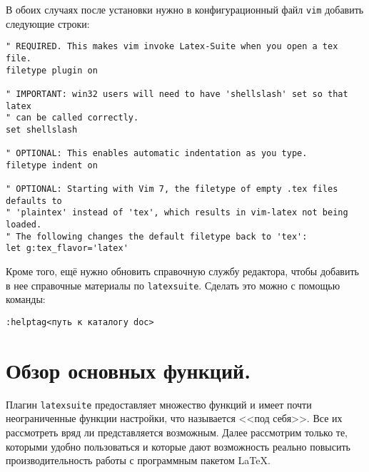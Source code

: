 \documentclass[a4paper]{article}
\begin{document}
В обоих случаях после установки нужно в 
конфигурационный файл \texttt{vim} добавить следующие строки:
\begin{verbatim}
" REQUIRED. This makes vim invoke Latex-Suite when you open a tex file.
filetype plugin on

" IMPORTANT: win32 users will need to have 'shellslash' set so that latex
" can be called correctly.
set shellslash

" OPTIONAL: This enables automatic indentation as you type.
filetype indent on

" OPTIONAL: Starting with Vim 7, the filetype of empty .tex files defaults to
" 'plaintex' instead of 'tex', which results in vim-latex not being loaded.
" The following changes the default filetype back to 'tex':
let g:tex_flavor='latex'
\end{verbatim}

Кроме того, ещё нужно обновить справочную службу редактора, чтобы добавить
в нее справочные материалы по \texttt{latexsuite}. Сделать это можно с помощью
команды: \begin{verbatim}
:helptag<путь к каталогу doc>
\end{verbatim}
\part{Обзор основных функций.}
Плагин \texttt{latexsuite} предоставляет множество функций и имеет почти
неограниченные функции настройки, что называется <<под себя>>. Все их
рассмотреть вряд ли представляется возможным. Далее рассмотрим только те,
которыми удобно пользоваться и которые дают возможность реально 
повысить производительность работы с программным пакетом \LaTeX.
\end{document}
